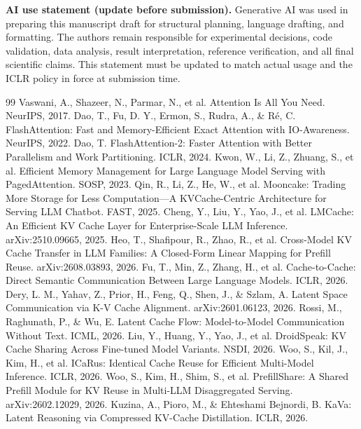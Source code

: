 \documentclass[10pt]{article}
\begin{document}
\textbf{AI use statement (update before submission).} Generative AI was used in preparing this
manuscript draft for structural planning, language drafting, and formatting. The authors remain
responsible for experimental decisions, code validation, data analysis, result interpretation,
reference verification, and all final scientific claims. This statement must be updated to match
actual usage and the ICLR policy in force at submission time.

\begin{thebibliography}{99}
 Vaswani, A., Shazeer, N., Parmar, N., et al. Attention Is All You Need. NeurIPS, 2017.
 Dao, T., Fu, D. Y., Ermon, S., Rudra, A., \& R\'e, C. FlashAttention: Fast and Memory-Efficient Exact Attention with IO-Awareness. NeurIPS, 2022.
 Dao, T. FlashAttention-2: Faster Attention with Better Parallelism and Work Partitioning. ICLR, 2024.
 Kwon, W., Li, Z., Zhuang, S., et al. Efficient Memory Management for Large Language Model Serving with PagedAttention. SOSP, 2023.
 Qin, R., Li, Z., He, W., et al. Mooncake: Trading More Storage for Less Computation---A KVCache-Centric Architecture for Serving LLM Chatbot. FAST, 2025.
 Cheng, Y., Liu, Y., Yao, J., et al. LMCache: An Efficient KV Cache Layer for Enterprise-Scale LLM Inference. arXiv:2510.09665, 2025.
 Heo, T., Shafipour, R., Zhao, R., et al. Cross-Model KV Cache Transfer in LLM Families: A Closed-Form Linear Mapping for Prefill Reuse. arXiv:2608.03893, 2026.
 Fu, T., Min, Z., Zhang, H., et al. Cache-to-Cache: Direct Semantic Communication Between Large Language Models. ICLR, 2026.
 Dery, L. M., Yahav, Z., Prior, H., Feng, Q., Shen, J., \& Szlam, A. Latent Space Communication via K-V Cache Alignment. arXiv:2601.06123, 2026.
 Rossi, M., Raghunath, P., \& Wu, E. Latent Cache Flow: Model-to-Model Communication Without Text. ICML, 2026.
 Liu, Y., Huang, Y., Yao, J., et al. DroidSpeak: KV Cache Sharing Across Fine-tuned Model Variants. NSDI, 2026.
 Woo, S., Kil, J., Kim, H., et al. ICaRus: Identical Cache Reuse for Efficient Multi-Model Inference. ICLR, 2026.
 Woo, S., Kim, H., Shim, S., et al. PrefillShare: A Shared Prefill Module for KV Reuse in Multi-LLM Disaggregated Serving. arXiv:2602.12029, 2026.
 Kuzina, A., Pioro, M., \& Ehteshami Bejnordi, B. KaVa: Latent Reasoning via Compressed KV-Cache Distillation. ICLR, 2026.

\end{thebibliography}
\end{document}
